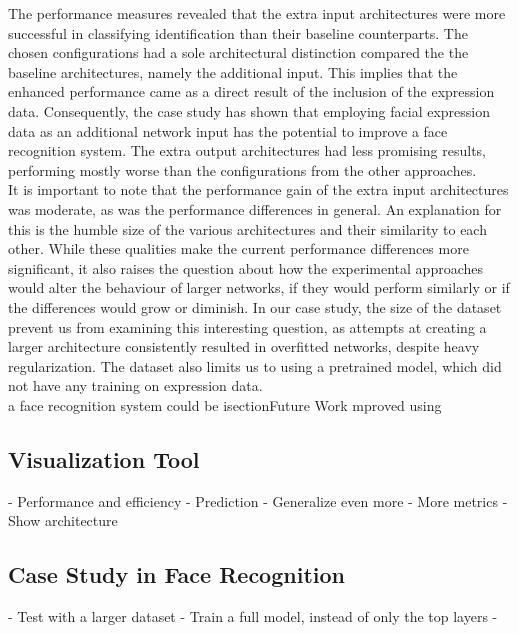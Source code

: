 \noindent The performance measures revealed that the extra input architectures were more successful in classifying identification than their baseline counterparts. The chosen configurations had a sole architectural distinction compared the the baseline architectures, namely the additional input. This implies that the enhanced performance came as a direct result of the inclusion of the expression data. Consequently, the case study has shown that employing facial expression data as an additional network input has the potential to improve a face recognition system. The extra output architectures had less promising results, performing mostly worse than the configurations from the other approaches. \\

\noindent It is important to note that the performance gain of the extra input architectures was moderate, as was the performance differences in general. An explanation for this is the humble size of the various architectures and their similarity to each other. While these qualities make the current performance differences more significant, it also raises the question about how the experimental approaches would alter the behaviour of larger networks, if they would perform similarly or if the differences would grow or diminish. In our case study, the size of the dataset prevent us from examining this interesting question, as attempts at creating a larger architecture consistently resulted in overfitted networks, despite heavy regularization. The dataset also limits us to using a pretrained model, which did not have any training on expression data. \\


\how a face recognition system could be isection{Future Work}
mproved using 
\subsection{Visualization Tool}

- Performance and efficiency
- Prediction
- Generalize even more
- More metrics
- Show architecture

\subsection{Case Study in Face Recognition}

- Test with a larger dataset %
- Train a full model, instead of only the top layers
- 


\cleardoublepage